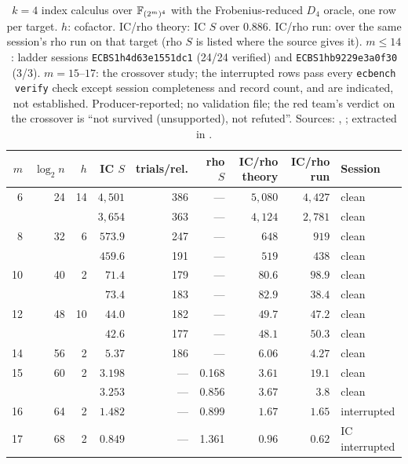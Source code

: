 \begin{table}[t]
\centering\small
\begin{tabular}{@{}rrrrrrrrl@{}}
\toprule
$m$ & $\log_2 n$ & $h$ & IC $S$ & trials/rel. & rho $S$ & IC/rho theory & IC/rho run & Session \\
\midrule
6 & 24 & 14 & $4{,}501$ & 386 & --- & $5{,}080$ & $4{,}427$ & clean \\
 & &  & $3{,}654$ & 363 & --- & $4{,}124$ & $2{,}781$ & clean \\
8 & 32 & 6 & $573.9$ & 247 & --- & $648$ & $919$ & clean \\
 & &  & $459.6$ & 191 & --- & $519$ & $438$ & clean \\
10 & 40 & 2 & $71.4$ & 179 & --- & $80.6$ & $98.9$ & clean \\
 & &  & $73.4$ & 183 & --- & $82.9$ & $38.4$ & clean \\
12 & 48 & 10 & $44.0$ & 182 & --- & $49.7$ & $47.2$ & clean \\
 & &  & $42.6$ & 177 & --- & $48.1$ & $50.3$ & clean \\
14 & 56 & 2 & $5.37$ & 186 & --- & $6.06$ & $4.27$ & clean \\
15 & 60 & 2 & $3.198$ & --- & 0.168 & $3.61$ & $19.1$ & clean \\
 & &  & $3.253$ & --- & 0.856 & $3.67$ & $3.8$ & clean \\
16 & 64 & 2 & $1.482$ & --- & 0.899 & $1.67$ & $1.65$ & interrupted \\
17 & 68 & 2 & $0.849$ & --- & 1.361 & $0.96$ & $0.62$ & IC interrupted \\
\bottomrule
\end{tabular}
\caption[]{$k=4$ index calculus over $\mathbb{F}_{(2^m)^4}$ with the
Frobenius-reduced $D_4$ oracle, one row per target. $h$: cofactor.
IC/rho theory: IC $S$ over $0.886$. IC/rho run: over the same session's
rho run on that target (rho $S$ is listed where the source gives it).
$m\le14$: ladder sessions \texttt{ECBS1h4d63e1551dc1} (24/24 verified) and
\texttt{ECBS1hb9229e3a0f30} (3/3). $m=15$--$17$: the crossover study; the
interrupted rows pass every \texttt{ecbench verify} check except session
completeness and record count, and are indicated, not established.
Producer-reported; no validation file; the red team's verdict on the
crossover is ``not survived (unsupported), not refuted''. Sources:
,
; extracted in
.}
\label{tab:pf-d4}
\end{table}

